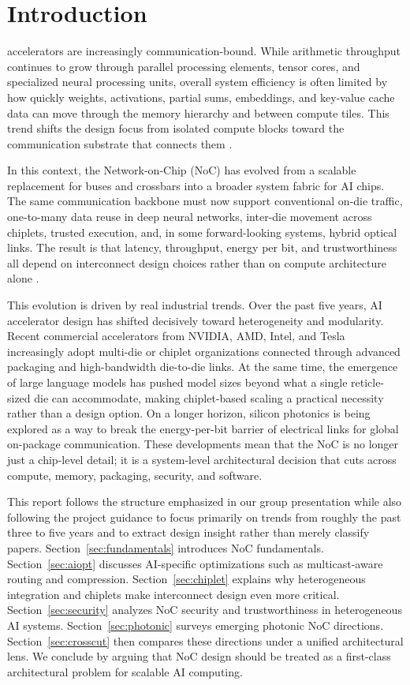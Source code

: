 \section{Introduction}
 accelerators are increasingly communication-bound. While arithmetic throughput continues to grow through parallel processing elements, tensor cores, and specialized neural processing units, overall system efficiency is often limited by how quickly weights, activations, partial sums, embeddings, and key-value cache data can move through the memory hierarchy and between compute tiles. This trend shifts the design focus from isolated compute blocks toward the communication substrate that connects them \cite{dally2001route,chen2016eyeriss}.

In this context, the Network-on-Chip (NoC) has evolved from a scalable replacement for buses and crossbars into a broader system fabric for AI chips. The same communication backbone must now support conventional on-die traffic, one-to-many data reuse in deep neural networks, inter-die movement across chiplets, trusted execution, and, in some forward-looking systems, hybrid optical links. The result is that latency, throughput, energy per bit, and trustworthiness all depend on interconnect design choices rather than on compute architecture alone \cite{bjerregaard2006survey,weerasena2024security}.

This evolution is driven by real industrial trends. Over the past five years, AI accelerator design has shifted decisively toward heterogeneity and modularity. Recent commercial accelerators from NVIDIA, AMD, Intel, and Tesla increasingly adopt multi-die or chiplet organizations connected through advanced packaging and high-bandwidth die-to-die links. At the same time, the emergence of large language models has pushed model sizes beyond what a single reticle-sized die can accommodate, making chiplet-based scaling a practical necessity rather than a design option. On a longer horizon, silicon photonics is being explored as a way to break the energy-per-bit barrier of electrical links for global on-package communication. These developments mean that the NoC is no longer just a chip-level detail; it is a system-level architectural decision that cuts across compute, memory, packaging, security, and software.

This report follows the structure emphasized in our group presentation while also following the project guidance to focus primarily on trends from roughly the past three to five years and to extract design insight rather than merely classify papers. Section~\ref{sec:fundamentals} introduces NoC fundamentals. Section~\ref{sec:aiopt} discusses AI-specific optimizations such as multicast-aware routing and compression. Section~\ref{sec:chiplet} explains why heterogeneous integration and chiplets make interconnect design even more critical. Section~\ref{sec:security} analyzes NoC security and trustworthiness in heterogeneous AI systems. Section~\ref{sec:photonic} surveys emerging photonic NoC directions. Section~\ref{sec:crosscut} then compares these directions under a unified architectural lens. We conclude by arguing that NoC design should be treated as a first-class architectural problem for scalable AI computing.
